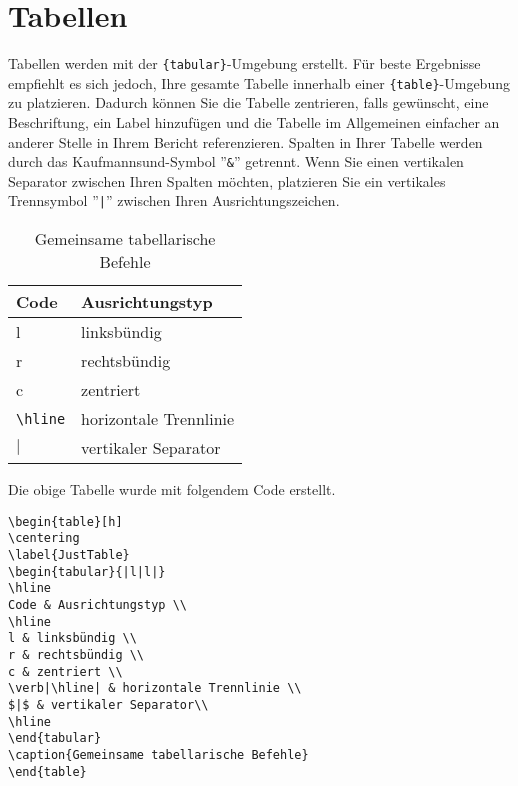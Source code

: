 \section{Tabellen}
Tabellen werden mit der \verb|{tabular}|-Umgebung erstellt. Für beste Ergebnisse empfiehlt es sich jedoch, Ihre gesamte Tabelle innerhalb einer \verb|{table}|-Umgebung zu platzieren. Dadurch können Sie die Tabelle zentrieren, falls gewünscht, eine Beschriftung, ein Label hinzufügen und die Tabelle im Allgemeinen einfacher an anderer Stelle in Ihrem Bericht referenzieren. Spalten in Ihrer Tabelle werden durch das Kaufmannsund-Symbol ''\verb|&|'' getrennt. Wenn Sie einen vertikalen Separator zwischen Ihren Spalten möchten, platzieren Sie ein vertikales Trennsymbol ''\texttt{|}'' zwischen Ihren Ausrichtungszeichen.

\begin{table}[h]
\centering
\label{JustTable}
\begin{tabular}{|l|l|}
\hline
Code & Ausrichtungstyp \\
\hline
l & linksbündig \\
r & rechtsbündig \\
c & zentriert \\
\verb|\hline| & horizontale Trennlinie \\
$|$ & vertikaler Separator\\
\hline
\end{tabular}
\caption{Gemeinsame tabellarische Befehle}
\end{table}

\noindent Die obige Tabelle wurde mit folgendem Code erstellt.
\begin{verbatim}
\begin{table}[h]
\centering
\label{JustTable}
\begin{tabular}{|l|l|}
\hline
Code & Ausrichtungstyp \\
\hline
l & linksbündig \\
r & rechtsbündig \\
c & zentriert \\
\verb|\hline| & horizontale Trennlinie \\
$|$ & vertikaler Separator\\
\hline
\end{tabular}
\caption{Gemeinsame tabellarische Befehle}
\end{table}
\end{verbatim}


